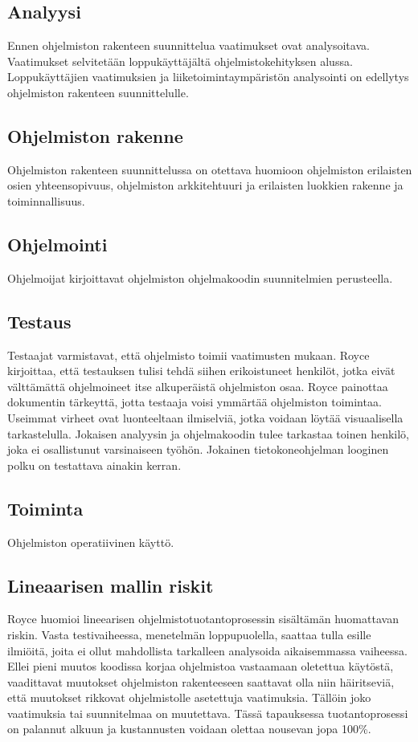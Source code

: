 \documentclass[finnish]{tktltiki2}
\theoremstyle{definition}
\theoremstyle{remark}
\begin{document}
\subsection*{Analyysi}
Ennen ohjelmiston rakenteen suunnittelua vaatimukset ovat analysoitava. Vaatimukset selvitetään loppukäyttäjältä ohjelmistokehityksen alussa. Loppukäyttäjien vaatimuksien ja liiketoimintaympäristön analysointi on edellytys ohjelmiston rakenteen suunnittelulle.  

 \subsection*{Ohjelmiston rakenne}
Ohjelmiston rakenteen suunnittelussa on otettava huomioon ohjelmiston erilaisten osien yhteensopivuus, ohjelmiston arkkitehtuuri ja erilaisten luokkien rakenne ja toiminnallisuus.  

 \subsection*{Ohjelmointi}
Ohjelmoijat kirjoittavat ohjelmiston ohjelmakoodin suunnitelmien perusteella.

 \subsection*{Testaus}
Testaajat varmistavat, että ohjelmisto toimii vaatimusten mukaan. Royce kirjoittaa, että testauksen tulisi tehdä siihen erikoistuneet henkilöt, jotka eivät välttämättä ohjelmoineet itse alkuperäistä ohjelmiston osaa. Royce painottaa dokumentin tärkeyttä, jotta testaaja voisi ymmärtää ohjelmiston toimintaa\cite{ROY70}. Useimmat virheet ovat luonteeltaan ilmiselviä, jotka voidaan löytää visuaalisella tarkastelulla. Jokaisen analyysin ja ohjelmakoodin tulee tarkastaa toinen henkilö, joka ei osallistunut varsinaiseen työhön. Jokainen tietokoneohjelman looginen polku on testattava ainakin kerran\cite{ROY70}.

 \subsection*{Toiminta}
Ohjelmiston operatiivinen käyttö.

\subsection*{Lineaarisen mallin riskit}

Royce huomioi lineearisen ohjelmistotuotantoprosessin sisältämän huomattavan riskin. Vasta testivaiheessa, menetelmän loppupuolella, saattaa tulla esille ilmiöitä, joita ei ollut mahdollista tarkalleen analysoida aikaisemmassa vaiheessa. Ellei pieni muutos koodissa korjaa ohjelmistoa vastaamaan oletettua käytöstä, vaadittavat muutokset ohjelmiston rakenteeseen saattavat olla niin häiritseviä, että muutokset rikkovat ohjelmistolle asetettuja vaatimuksia. Tällöin joko vaatimuksia tai suunnitelmaa on muutettava. Tässä tapauksessa tuotantoprosessi on palannut alkuun ja kustannusten voidaan olettaa nousevan jopa 100\%\cite{ROY70}.
\end{document}
